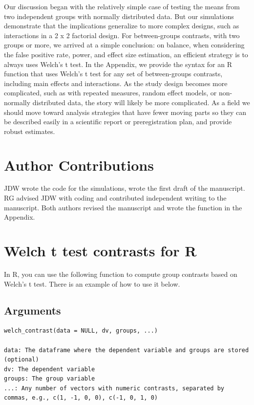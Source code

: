 \documentclass[man, noextraspace, apacite, floatsintext]{apa6}
\begin{document}
Our discussion began with the relatively simple case of testing the means from two independent groups with normally distributed data.
But our simulations demonstrate that the implications generalize to more complex designs, such as interactions in a 2 x 2 factorial design.
For between-groups contrasts, with two groups or more, we arrived at a simple conclusion: on balance, when considering the false positive rate, power, and effect size estimation, an efficient strategy is to always uses Welch's t test.  In the Appendix, we provide the syntax for an R function that uses Welch's t test for any set of between-groups contrasts, including main effects and interactions. As the study design becomes more complicated, such as with repeated measures, random effect models, or non-normally distributed data, the story will likely be more complicated. As a field we should move toward analysis strategies that have fewer moving parts so they can be described easily in a scientific report or preregistration plan, and  provide robust estimates.

\section{Author Contributions}

JDW wrote the code for the simulations, wrote the first draft of the manuscript. RG advised JDW with coding and contributed independent writing to the manuscript. Both authors revised the manuscript and wrote the function in the Appendix. 






\appendix
\section{Welch t test contrasts for R}

In R, you can use the following function to compute group contrasts based on Welch's t test. There is an example of how to use it below.

\subsection{Arguments}
\begin{small}
\begin{singlespace}
\begin{lstlisting}
welch_contrast(data = NULL, dv, groups, ...)

data: The dataframe where the dependent variable and groups are stored (optional)
dv: The dependent variable
groups: The group variable
...: Any number of vectors with numeric contrasts, separated by commas, e.g., c(1, -1, 0, 0), c(-1, 0, 1, 0)
\end{lstlisting}
\end{singlespace}
\end{small}
\end{document}
